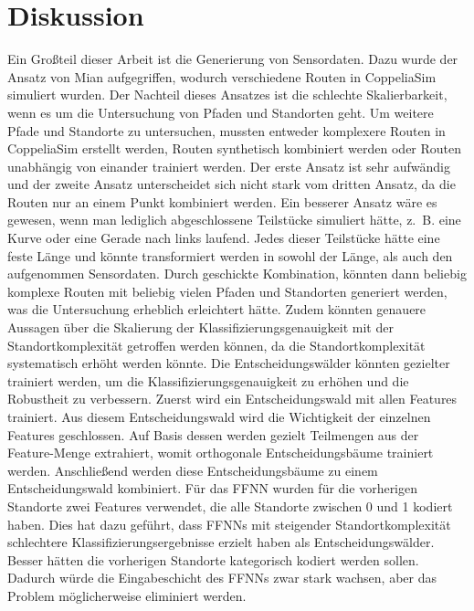 \chapter{Diskussion}
\label{chapter:discussion}
Ein Großteil dieser Arbeit ist die Generierung von Sensordaten.
Dazu wurde der Ansatz von Mian aufgegriffen, wodurch verschiedene Routen in CoppeliaSim simuliert wurden.
Der Nachteil dieses Ansatzes ist die schlechte Skalierbarkeit, wenn es um die Untersuchung von Pfaden und Standorten geht.
Um weitere Pfade und Standorte zu untersuchen, mussten entweder komplexere Routen in CoppeliaSim erstellt werden,
Routen synthetisch kombiniert werden oder Routen unabhängig von einander trainiert werden.
\newline
\newline
Der erste Ansatz ist sehr aufwändig und der zweite Ansatz unterscheidet sich nicht stark vom dritten Ansatz,
da die Routen nur an einem Punkt kombiniert werden.
Ein besserer Ansatz wäre es gewesen, wenn man lediglich abgeschlossene Teilstücke simuliert hätte,
z.~B. eine Kurve oder eine Gerade nach links laufend.
Jedes dieser Teilstücke hätte eine feste Länge und könnte transformiert werden in sowohl der Länge, als auch den aufgenommen Sensordaten.
Durch geschickte Kombination, könnten dann beliebig komplexe Routen mit beliebig vielen Pfaden und Standorten generiert werden,
was die Untersuchung erheblich erleichtert hätte.
Zudem könnten genauere Aussagen über die Skalierung der Klassifizierungsgenauigkeit mit der Standortkomplexität getroffen werden können,
da die Standortkomplexität systematisch erhöht werden könnte.
\newline
\newline
Die Entscheidungswälder könnten gezielter trainiert werden, um die Klassifizierungsgenauigkeit zu erhöhen und die Robustheit zu verbessern.
Zuerst wird ein Entscheidungswald mit allen Features trainiert.
Aus diesem Entscheidungswald wird die Wichtigkeit der einzelnen Features geschlossen.
Auf Basis dessen werden gezielt Teilmengen aus der Feature-Menge extrahiert, womit orthogonale Entscheidungsbäume trainiert werden.
Anschließend werden diese Entscheidungsbäume zu einem Entscheidungswald kombiniert.
\newpage
Für das FFNN wurden für die vorherigen Standorte zwei Features verwendet, die alle Standorte zwischen 0 und 1 kodiert haben.
Dies hat dazu geführt, dass FFNNs mit steigender Standortkomplexität schlechtere Klassifizierungsergebnisse erzielt haben als Entscheidungswälder.
Besser hätten die vorherigen Standorte kategorisch kodiert werden sollen.
Dadurch würde die Eingabeschicht des FFNNs zwar stark wachsen, aber das Problem möglicherweise eliminiert werden.

